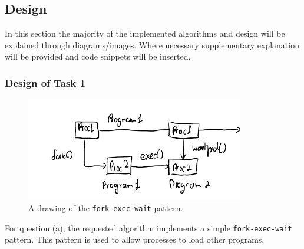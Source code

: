 \documentclass[12pt]{article}
\begin{document}
\begin{center}
\begin{minipage}[t]{0.3\textwidth}
\end{minipage}
\begin{minipage}[t]{0.3\textwidth}
\end{minipage}
\begin{minipage}[t]{0.3\textwidth}
\end{minipage}
\end{center}

\subsection{Design}

In this section the majority of the implemented algorithms and
design will be explained through diagrams/images. Where
necessary supplementary explanation will be provided and code
snippets will be inserted.

\subsubsection{Design of Task 1}

\begin{figure}[H]
\centering
\includegraphics[height=4.5cm]{task1qa}
\caption{A drawing of the \texttt{fork-exec-wait} pattern.}
\end{figure}



For question (a), the requested algorithm implements a simple
\texttt{fork-exec-wait} pattern. This pattern is used to allow
processes to load other programs.
\end{document}

